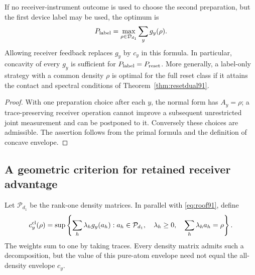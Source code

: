 \begin{corollary}\label{cor:feedbackroof91}
If no receiver-instrument outcome is used to choose the second
preparation, but the first device label may be used, the optimum is
\[
 P_{\rm label}=\max_{\rho\in\mathcal D_{d_1}}\sum_yg_y(\rho).
\]
Allowing receiver feedback replaces $g_y$ by $c_y$ in this formula.
In particular, concavity of every $g_y$ is sufficient for
$P_{\rm label}=P_{\rm reset}$.  More generally, a label-only strategy
with a common density $\rho$ is optimal for the full reset class if
it attains the contact and spectral conditions of
Theorem~\ref{thm:resetdual91}.
\end{corollary}
\begin{proof}
With one preparation choice after each $y$, the normal form has
$A_y=\rho$; a trace-preserving receiver operation cannot improve a
subsequent unrestricted joint measurement and can be postponed to it.
Conversely these choices are admissible.  The assertion follows from
the primal formula and the definition of concave envelope.
\end{proof}

\subsection{A geometric criterion for retained receiver advantage}
Let $\mathcal P_{d_1}$ be the rank-one density matrices.  In parallel
with \eqref{eq:roof91}, define
\begin{equation}\label{eq:pureroot91}
 c_y^{\rm cl}(\rho)=\sup\left\{\sum_h\lambda_h g_y(a_h):
 a_h\in\mathcal P_{d_1},\quad
 \lambda_h\ge0,\quad\sum_h\lambda_h a_h=\rho\right\}.
\end{equation}
The weights sum to one by taking traces.  Every density matrix admits
such a decomposition, but the value of this pure-atom envelope need
not equal the all-density envelope $c_y$.

